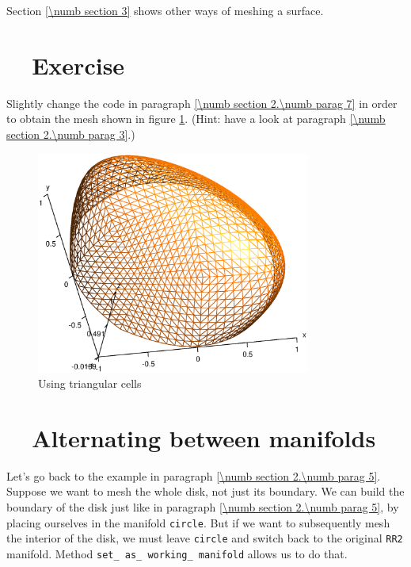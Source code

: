 Section \ref{\numb section 3} shows other ways of meshing a surface.


\section{~~Exercise}\label{\numb section 2.\numb parag 8}

Slightly change the code in paragraph \ref{\numb section 2.\numb parag 7}
in order to obtain the mesh shown in figure \ref{\numb section 2.\numb fig 8}.
(Hint: have a look at paragraph \ref{\numb section 2.\numb parag 3}.)

\begin{figure}[ht] \centering
  \includegraphics[width=90mm]{hemisphere-1}
  \caption{Using triangular cells}
  \label{\numb section 2.\numb fig 8}
\end{figure}


\section{~~Alternating between manifolds}\label{\numb section 2.\numb parag 9}

Let's go back to the example in paragraph \ref{\numb section 2.\numb parag 5}.
Suppose we want to mesh the whole disk, not just its boundary.
We can build the boundary of the disk just like in paragraph
\ref{\numb section 2.\numb parag 5}, by placing ourselves in the manifold {\small\tt circle}.
But if we want to subsequently mesh the interior of the disk, we must leave {\small\tt circle}
and switch back to the original {\small\tt RR2} manifold.
Method {\small\tt set\_\,as\_\,working\_\,manifold} allows us to do that.

